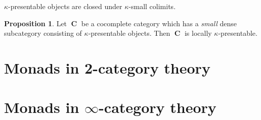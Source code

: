 \documentclass[a4paper,11pt,fullpage,oneside,openany]{amsbook}
\DeclareMathOperator{\C}{\mathbf{C}}
\theoremstyle{definition}
\theoremstyle{definition}
\newtheorem{prop}[thm]{Proposition}
\theoremstyle{remark}
\begin{document}
\begin{center}
	$\kappa$-presentable objects are closed under $\kappa$-small colimits.
\end{center}
\begin{prop}
	Let $\C$ be a cocomplete category which has a \emph{small} dense subcategory consisting of $\kappa$-presentable objects. Then $\C$ is locally $\kappa$-presentable.
\end{prop}






























	\chapter{Monads in 2-category theory}
	
	\chapter{Monads in $\infty$-category theory}
	
	
	
	
	\backmatter
	
\end{document}
